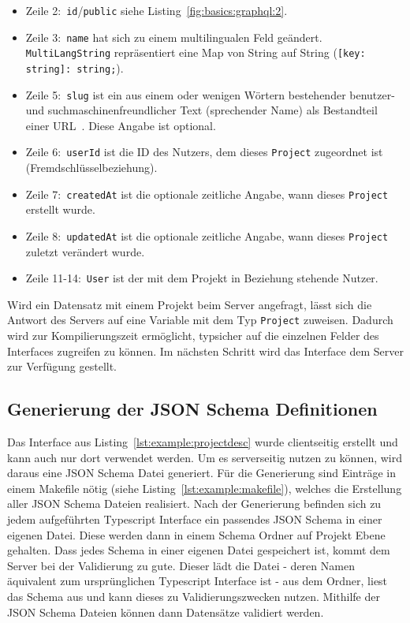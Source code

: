 \begin{itemize}
    \setlength\itemsep{-1em}
    \item Zeile 2:~\texttt{id}/\texttt{public} siehe Listing~\ref{fig:basics:graphql:2}.
    \item Zeile 3:~\texttt{name} hat sich zu einem multilingualen Feld geändert. \texttt{MultiLangString} repräsentiert eine Map von String auf String (\texttt{[key: string]: string;}).
    \item Zeile 5:~\texttt{slug} ist ein aus einem oder wenigen Wörtern bestehender benutzer- und suchmaschinenfreundlicher
    Text (sprechender Name) als Bestandteil einer URL~\cite{slug-wikipedia}. Diese Angabe ist optional.
    \item Zeile 6:~\texttt{userId} ist die ID des Nutzers, dem dieses \texttt{Project} zugeordnet ist (Fremdschlüsselbeziehung).
    \item Zeile 7:~\texttt{createdAt} ist die optionale zeitliche Angabe, wann dieses \texttt{Project} erstellt wurde.
    \item Zeile 8:~\texttt{updatedAt} ist die optionale zeitliche Angabe, wann dieses \texttt{Project} zuletzt verändert wurde.
     \item Zeile 11-14:~\texttt{User} ist der mit dem Projekt in Beziehung stehende Nutzer.
\end{itemize}

Wird ein Datensatz mit einem Projekt beim Server angefragt, lässt sich die Antwort des Servers auf eine Variable mit dem Typ \texttt{Project} zuweisen.
Dadurch wird zur Kompilierungszeit ermöglicht, typsicher auf die einzelnen Felder des Interfaces zugreifen zu können.
Im nächsten Schritt wird das Interface dem Server zur Verfügung gestellt.

\subsection{Generierung der JSON Schema Definitionen}
\label{sec:requirements:example:schema}
Das Interface aus Listing~\ref{lst:example:projectdesc} wurde clientseitig erstellt und kann auch nur dort verwendet werden. Um es serverseitig nutzen zu können, wird daraus eine JSON Schema Datei generiert.
Für die Generierung sind Einträge in einem Makefile nötig (siehe Listing~\ref{lst:example:makefile}), welches die Erstellung aller JSON Schema Dateien realisiert. Nach der Generierung befinden sich zu jedem aufgeführten Typescript Interface ein passendes JSON Schema in einer eigenen Datei. Diese werden dann in einem Schema Ordner auf Projekt Ebene gehalten. Dass jedes Schema in einer eigenen Datei gespeichert ist, kommt dem Server bei der Validierung zu gute. 
Dieser lädt die Datei - deren Namen äquivalent zum ursprünglichen Typescript Interface ist - aus dem Ordner, liest das Schema aus und kann dieses zu Validierungszwecken nutzen.
Mithilfe der JSON Schema Dateien können dann Datensätze validiert werden.

